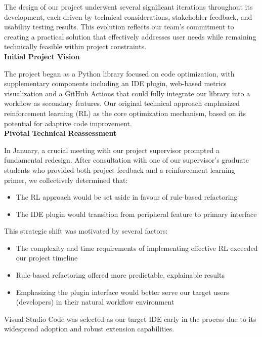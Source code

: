 \documentclass{article}
\begin{document}
The design of our project underwent several significant iterations throughout its development, each driven by technical considerations, stakeholder feedback, and usability testing results. This evolution reflects our team's commitment to creating a practical solution that effectively addresses user needs while remaining technically feasible within project constraints.\\


\noindent \textbf{Initial Project Vision}

\noindent
The project began as a Python library focused on code optimization, with supplementary components including an IDE plugin, web-based metrics visualization and a GitHub Actions that could fully integrate our library into a workflow as secondary features. Our original technical approach emphasized reinforcement learning (RL) as the core optimization mechanism, based on its potential for adaptive code improvement.\\


\noindent \textbf{Pivotal Technical Reassessment}

\noindent
In January, a crucial meeting with our project supervisor prompted a fundamental redesign. After consultation with one of our supervisor's graduate students who provided both project feedback and a reinforcement learning primer, we collectively determined that:

\begin{itemize}
    \item The RL approach would be set aside in favour of rule-based refactoring
    \item The IDE plugin would transition from peripheral feature to primary interface
\end{itemize}

This strategic shift was motivated by several factors:
\begin{itemize}
    \item The complexity and time requirements of implementing effective RL exceeded our project timeline
    \item Rule-based refactoring offered more predictable, explainable results
    \item Emphasizing the plugin interface would better serve our target users (developers) in their natural workflow environment
\end{itemize}

Visual Studio Code was selected as our target IDE early in the process due to its widespread adoption and robust extension capabilities.\\
\end{document}
